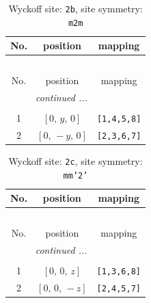 \documentclass[fleqn,8pt]{jsarticle}
\begin{document}
\begin{longtable}{ccc}
\caption{Wyckoff site: {\tt 2b}, site symmetry: {\tt m2m}}
 \\
 \hline \hline
No. & position & mapping \\ \hline \endfirsthead

\multicolumn{2}{l}{\tablename\ \thetable{}} \\
 \hline \hline
No. & position & mapping \\ \hline \endhead

 \hline \hline
\multicolumn{2}{r}{\footnotesize\it continued ...} \\ \endfoot

 \hline \hline
\multicolumn{2}{r}{} \\ \endlastfoot

1 & $\left[ 0,\, y,\, 0 \right]$ & {\tt [1,4,5,8]} \\ \hline
2 & $\left[ 0,\, - y,\, 0 \right]$ & {\tt [2,3,6,7]} \\
\end{longtable}
\renewcommand{\arraystretch}{1.2}
\begin{longtable}{ccc}
\caption{Wyckoff site: {\tt 2c}, site symmetry: {\tt mm'2'}}
 \\
 \hline \hline
No. & position & mapping \\ \hline \endfirsthead

\multicolumn{2}{l}{\tablename\ \thetable{}} \\
 \hline \hline
No. & position & mapping \\ \hline \endhead

 \hline \hline
\multicolumn{2}{r}{\footnotesize\it continued ...} \\ \endfoot

 \hline \hline
\multicolumn{2}{r}{} \\ \endlastfoot

1 & $\left[ 0,\, 0,\, z \right]$ & {\tt [1,3,6,8]} \\ \hline
2 & $\left[ 0,\, 0,\, - z \right]$ & {\tt [2,4,5,7]} \\
\end{longtable}
\renewcommand{\arraystretch}{1.2}
\end{document}

